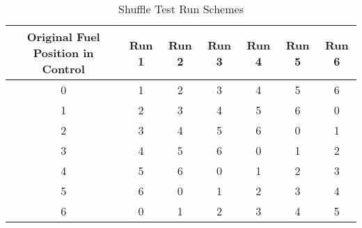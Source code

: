 \begin{table}[h!]
\centering
\caption{Shuffle Test Run Schemes}
\begin{tabular}{ c  c  c  c  c  c  c }
\hline
Original Fuel Position in Control & Run 1 & Run 2 & Run 3 & Run 4 & Run 5 & Run 6  \\
\hline
0 & 1 & 2 & 3 & 4 & 5 & 6 \\
1 & 2 & 3 & 4 & 5 & 6 & 0 \\
2 & 3 & 4 & 5 & 6 & 0 & 1 \\
3 & 4 & 5 & 6 & 0 & 1 & 2 \\
4 & 5 & 6 & 0 & 1 & 2 & 3 \\
5 & 6 & 0 & 1 & 2 & 3 & 4 \\
6 & 0 & 1 & 2 & 3 & 4 & 5 \\
\hline
\end{tabular}

\label{table:shuffle}
\end{table}